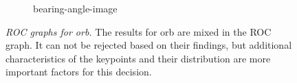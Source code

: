 \begin{figure}[htp]
\begin{subfigure}[t]{0.45\linewidth}
    \caption{\gls{bearing-angle-image}}
\end{subfigure}
\caption[\acrshort{ROC} graphs for \acrshort{orb}]{\emph{\acrshort{ROC} graphs for \acrshort{orb}.} The results for \acrshort{orb} are mixed in the \acrshort{ROC} graph. It can not be rejected based on their findings, but additional characteristics of the keypoints and their distribution are more important factors for this decision.}\label{fig:orb_roc}
\end{figure}
